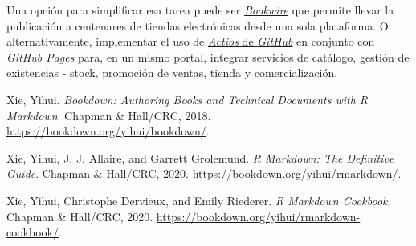 \documentclass[
]{book}
\begin{document}
Una opción para simplificar esa tarea puede ser \href{https://www.bookwire.es/}{\emph{Bookwire}} que permite llevar la publicación a centenares de tiendas electrónicas desde una sola plataforma. O alternativamente, implementar el uso de \href{https://docs.github.com/en/actions}{\emph{Actios} de \emph{GitHub}} en conjunto con \emph{GitHub Pages} para, en un mismo portal, integrar servicios de catálogo, gestión de existencias - stock, promoción de ventas, tienda y comercialización.

Xie, Yihui. \emph{Bookdown: Authoring Books and Technical Documents with R Markdown}. Chapman \& Hall/CRC, 2018. \url{https://bookdown.org/yihui/bookdown/}.

Xie, Yihui, J. J. Allaire, and Garrett Grolemund. \emph{R Markdown: The Definitive Guide}. Chapman \& Hall/CRC, 2020. \url{https://bookdown.org/yihui/rmarkdown/}.

Xie, Yihui, Christophe Dervieux, and Emily Riederer. \emph{R Markdown Cookbook}. Chapman \& Hall/CRC, 2020. \url{https://bookdown.org/yihui/rmarkdown-cookbook/}.

  
\end{document}
